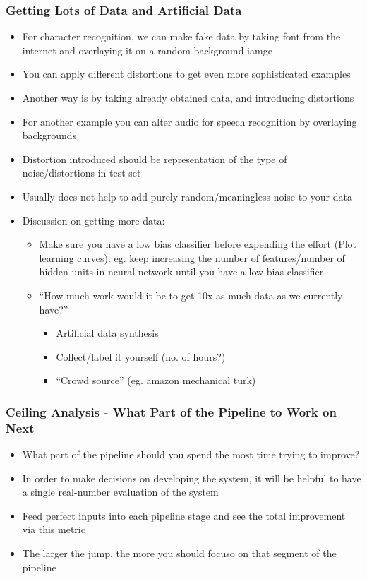 \subsubsection{Getting Lots of Data and Artificial Data}
\begin{itemize}[--]
	\item For character recognition, we can make fake data by taking font from the internet and overlaying it on a random background iamge
	\item You can apply different distortions to get even more sophisticated examples
	\item Another way is by taking already obtained data, and introducing distortions
	\item For another example you can alter audio for speech recognition by overlaying backgrounds
	\item Distortion introduced should be representation of the type of noise/distortions in test set
	\item Usually does not help to add purely random/meaningless noise to your data
	\item Discussion on getting more data:
	\begin{itemize}[--]
		\item Make sure you have a low bias classifier before expending the effort (Plot learning curves). eg. keep increasing the number of features/number of hidden units in neural network until you have a low bias classifier
		\item  ``How much work would it be to get 10x as much data as we currently have?''
		\begin{itemize}[--]
			\item Artificial data synthesis
			\item Collect/label it yourself (no. of hours?)
			\item ``Crowd source'' (eg. amazon mechanical turk)
		\end{itemize}
	\end{itemize}
\end{itemize}

\subsubsection{Ceiling Analysis - What Part of the Pipeline to Work on Next}
\begin{itemize}[--]
	\item  What part of the pipeline should you spend the most time trying to improve?
	\item In order to make decisions on developing the system, it will be helpful to have a single real-number evaluation of the system
	\item Feed perfect inputs into each pipeline stage and see the total improvement via this metric
	\item The larger the jump, the more you should focuso on that segment of the pipeline
\end{itemize}

